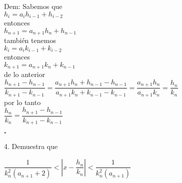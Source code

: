 \documentclass[11pt, article]{memoir}
\begin{document}
Dem: Sabemos que\\
$h_{i}=a_{i}h_{i-1}+h_{i-2}$ \\
entonces\\
$h_{n+1}=a_{n+1}h_{n}+h_{n-1}$\\
también tenemos\\
$k_{i}=a_{i}k_{i-1}+k_{i-2}$\\
entonces\\
$k_{n+1}=a_{n+1}k_{n}+k_{n-1}$ \\
de lo anterior\\
$\dfrac{h_{n+1}-h_{n-1}}{k_{n+1}-k_{n-1}}=\dfrac{a_{n+1}h_{n}+h_{n-1}-h_{n-1}}{a_{n+1}k_{n}+k_{n-1}-k_{n-1}}=\dfrac{a_{n+1}h_{n}}{a_{n+1}k_{n}}=\dfrac{h_{n}}{k_{n}}$\\
por lo tanto\\
$\dfrac{h_{n}}{k_{n}}=\dfrac{h_{n+1}-h_{n-1}}{k_{n+1}-k_{n-1}}$\\
\begin{flushright}
$\square$
\end{flushright}

4. Demuestra que \\
\begin{center}
$\dfrac{1}{k_{n}^{2}(a_{n+1}+2)} < \left|x-\dfrac{h_{n}}{k_{n}}\right|< \dfrac{1}{k_{n}^{2}(a_{n+1})}$\\
\end{center}
\end{document}
